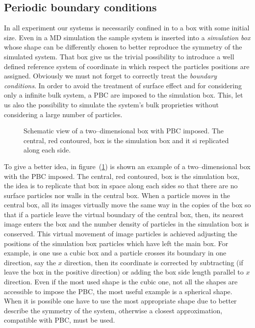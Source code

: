 \subsection{Periodic boundary conditions}
In all experiment our systems is necessarily confined in to a box with some initial size. Even in a \ac{MD} simulation the sample system is inserted into a \textit{simulation box} whose shape can be differently chosen to better reproduce the symmetry of the simulated system. That box give us the trivial possibility to introduce a well defined reference system of coordinate in which respect the particles positions are assigned. Obviously we must not forget to correctly treat the \textit{boundary conditions}. In order to avoid the treatment of surface effect and for considering only a infinite bulk system, a \ac{PBC} are imposed to the simulation box. This, let us also the possibility to simulate the system's bulk proprieties without considering a large number of particles.
\begin{figure}
\caption{Schematic view of a two--dimensional box with PBC imposed. The central, red contoured, box is the simulation box and it si replicated along each side.}
\label{fig:pbc}
\end{figure}
To give a better idea, in figure~(\ref{fig:pbc}) is shown an example of a two--dimensional box with the \ac{PBC} imposed. The central, red contoured, box is the simulation box, the idea is to replicate that box in space along each sides so that there are no surface particles nor walls in the central box. When a particle moves in the central box, all its images virtually move the same way in the copies of the box so that if a particle leave the virtual boundary of the central box, then, its nearest image enters the box and the number density of particles in the simulation box is conserved. This virtual movement of image particles is achieved adjusting the positions of the simulation box particles which have left the main box. For example, is one use a cubic box and a particle crosses its boundary in one direction, say the $x$ direction, then its coordinate is corrected by subtracting (if leave the box in the positive direction) or adding the box side length parallel to $x$ direction. Even if the most used shape is the cubic one, not all the shapes are accessible to impose the \ac{PBC}, the most useful example is a spherical shape. When it is possible one have to use the most appropriate shape due to better describe the symmetry of the system, otherwise a closest approximation, compatible with \ac{PBC}, must be used.

